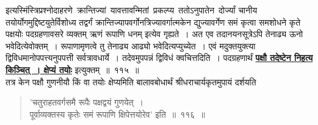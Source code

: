 \documentclass[11pt, openany]{book}
\begin{document}
 इत्यस्मिंस्त्रिप्रश्नोदाहरणे \,क्रान्तिज्यां \,यावत्तावन्मितां \,प्रकल्प्य \,ततोऽनुपातेन \,दोर्ज्यां चानीय तयोर्योगमुद्दिष्टयुतेर्विशोध्य तद्वर्गं
क्रान्तिज्यापवर्गोनत्रिज्यावर्गात्मकेन द्युज्यावर्गेण समं कृत्वा समशोधने कृते पक्षयोः पदग्रहणावसरे व्यक्तम् ऋणं रूपाणि धनम् इत्येव गृह्यते~। अत एव तदानयनसूत्रेऽपि तेनाढ्य ऊनो भवेदित्येवोक्तम्~। रूपाणामृणत्वे तु तेनाढ्य आढ्यो भवेदित्यप्युच्येत~। एवं मदुक्तयुक्त्या द्विविधमानोपपत्त्यनुपपत्ती सर्वत्रावधार्ये~। तदेवमुपपन्नं द्विविधं क्वचित्तदिति~। पदग्रहणार्थं \hyperref[115]{\textbf{पक्षौ तदेष्टेन निहत्य किञ्चित्~। क्षेप्यं तयोः}} इत्युक्तम्~॥~११५~॥\\

\vspace{-2mm}
 तत्र केन पक्षौ गुणनीयौ किं वा तयोः क्षेप्यमिति बालावबोधार्थं
श्रीधराचार्यकृतमुपायं दर्शयति\textendash

 \label{116}
\begin{quote}
\ab
 'चतुराहतवर्गसमै रूपैः पक्षद्वयं गुणयेत्~। \\
 पूर्वाव्यक्तस्य कृतेः समं रूपाणि क्षिपेत्तयोरेव' इति~॥~११६~॥
\end{quote}

\newpage
\end{document}
